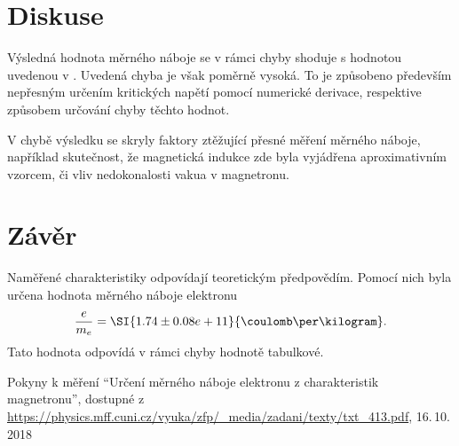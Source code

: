 \documentclass{protokol}
\begin{document}
  \section*{Diskuse}

    Výsledná hodnota měrného náboje se v rámci chyby shoduje s hodnotou uvedenou v \cite{pokyny}. Uvedená chyba je však poměrně vysoká. To je způsobeno především  nepřesným určením kritických napětí pomocí numerické derivace, respektive způsobem určování chyby těchto hodnot. 

    V chybě výsledku se skryly faktory ztěžující přesné měření měrného náboje, například skutečnost, že magnetická indukce zde byla vyjádřena aproximativním vzorcem, či vliv nedokonalosti vakua v magnetronu.

  \section*{Závěr}

    Naměřené charakteristiky odpovídají teoretickým předpovědím. Pomocí nich byla určena hodnota měrného náboje elektronu 
    $$ \frac{ e }{ m_e } = \SI{1.74 \pm 0.08 e+11}{\coulomb\per\kilogram}. $$
    Tato hodnota odpovídá v rámci chyby hodnotě tabulkové.

  \begin{thebibliography}{}
 
    Pokyny k měření ``Určení měrného náboje elektronu z charakteristik magnetronu'', dostupné z\\ \url{https://physics.mff.cuni.cz/vyuka/zfp/_media/zadani/texty/txt_413.pdf}, 16.\,10.\,2018
   
  \end{thebibliography}
\end{document}
